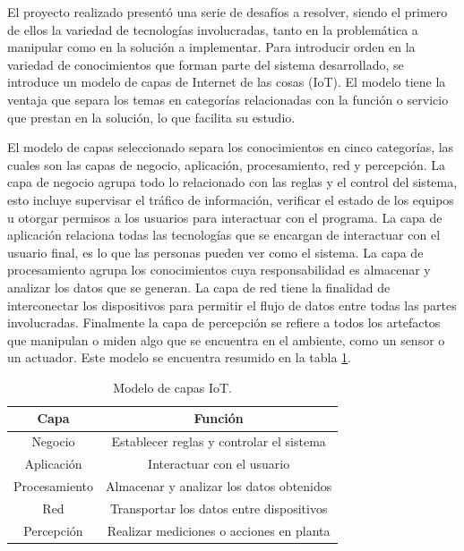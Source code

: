 El proyecto realizado presentó una serie de desafíos a resolver, siendo el primero de ellos la variedad de tecnologías involucradas, tanto en la problemática a manipular como en la solución a implementar. Para introducir orden en la variedad de conocimientos que forman parte del sistema desarrollado, se introduce un modelo de capas de Internet de las cosas (IoT). El modelo tiene la ventaja que separa los temas en categorías relacionadas con la función o servicio que prestan en la solución, lo que facilita su estudio. 

El modelo de capas seleccionado separa los conocimientos en cinco categorías, las cuales son las capas de negocio, aplicación, procesamiento, red y percepción.
La capa de negocio agrupa todo lo relacionado con las reglas y el control del sistema, esto incluye supervisar el tráfico de información, verificar el estado de los equipos u otorgar permisos a los usuarios para interactuar con el programa.
La capa de aplicación relaciona todas las tecnologías que se encargan de interactuar con el usuario final, es lo que las personas pueden ver como el sistema.
La capa de procesamiento agrupa los conocimientos cuya responsabilidad es almacenar y analizar los datos que se generan.
La capa de red tiene la finalidad de interconectar los dispositivos para permitir el flujo de datos entre todas las partes involucradas.
Finalmente la capa de percepción se refiere a todos los artefactos que manipulan o miden algo que se encuentra en el ambiente, como un sensor o un actuador. Este modelo se encuentra resumido en la tabla \ref{tab:modeloCapas}.

\begin{table}[h]
	\centering
	\caption{\label{tab:modeloCapas}Modelo de capas IoT.}
	\begin{tabular}{c c}
		\toprule
		\textbf{Capa} & \textbf{Función}                         \\
		\midrule
		Negocio       & Establecer reglas y controlar el sistema \\
		Aplicación    & Interactuar con el usuario               \\
		Procesamiento & Almacenar y analizar los datos obtenidos \\
		Red           & Transportar los datos entre dispositivos \\
		Percepción    & Realizar mediciones o acciones en planta \\
		\bottomrule
		\hline
	\end{tabular}
\end{table}

